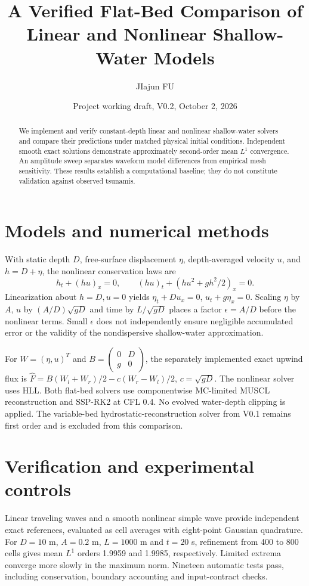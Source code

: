\documentclass[11pt]{article}
\title{A Verified Flat-Bed Comparison of Linear and Nonlinear Shallow-Water Models}
\author{JIajun FU}
\date{Project working draft, V0.2, October 2, 2026}
\begin{document}
\maketitle
\begin{abstract}
We implement and verify constant-depth linear and nonlinear shallow-water
solvers and compare their predictions under matched physical initial conditions.
Independent smooth exact solutions demonstrate approximately second-order mean
$L^1$ convergence. An amplitude sweep separates waveform model differences from
empirical mesh sensitivity. These results establish a computational baseline;
they do not constitute validation against observed tsunamis.
\end{abstract}
\section{Models and numerical methods}
With static depth $D$, free-surface displacement $\eta$, depth-averaged velocity
$u$, and $h=D+\eta$, the nonlinear conservation laws are
\[
h_t+(hu)_x=0,\qquad (hu)_t+(hu^2+gh^2/2)_x=0.
\]
Linearization about $h=D,u=0$ yields $\eta_t+Du_x=0$, $u_t+g\eta_x=0$.
Scaling $\eta$ by $A$, $u$ by $(A/D)\sqrt{gD}$ and time by
$L/\sqrt{gD}$ places a factor $\epsilon=A/D$ before the nonlinear terms.
Small $\epsilon$ does not independently ensure negligible accumulated error
or the validity of the nondispersive shallow-water approximation.

For $W=(\eta,u)^T$ and $B=\left(\begin{smallmatrix}0&D\\g&0\end{smallmatrix}\right)$,
the separately implemented exact upwind flux is
$\widehat F= B(W_l+W_r)/2-c(W_r-W_l)/2$, $c=\sqrt{gD}$.
The nonlinear solver uses HLL. Both flat-bed solvers use componentwise
MC-limited MUSCL reconstruction and SSP-RK2 at CFL 0.4. No evolved water-depth
clipping is applied. The variable-bed hydrostatic-reconstruction solver from
V0.1 remains first order and is excluded from this comparison.

\section{Verification and experimental controls}
Linear traveling waves and a smooth nonlinear simple wave provide independent
exact references, evaluated as cell averages with eight-point Gaussian quadrature.
For $D=10$ m, $A=0.2$ m, $L=1000$ m and $t=20$ s, refinement from 400 to
800 cells gives mean $L^1$ orders 1.9959 and 1.9985, respectively. Limited extrema
converge more slowly in the maximum norm. Nineteen automatic tests pass,
including conservation, boundary accounting and input-contract checks.
\end{document}
